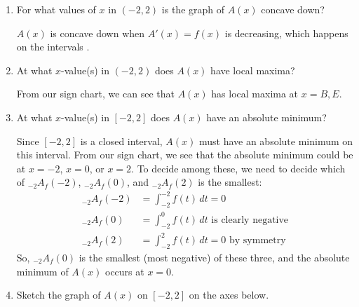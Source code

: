 \documentclass{article}
\begin{document}
\begin{enumerate}
\begin{enumerate}[resume]
  \item
    \begin{problem}[\vfill\newpage]
      For what values of $x$ in $(-2, 2)$ is the graph of $A(x)$
      concave down?
    \end{problem}

    \begin{solution}
      $A(x)$ is concave down when $A'(x) = f(x)$ is
      decreasing, which happens on the intervals .
    \end{solution}

  \item
    \begin{problem}[\vfill]
      At what $x$-value(s) in $(-2, 2)$ does $A(x)$ have local
      maxima? 
    \end{problem}

    \begin{solution}
      From our sign chart, we can see that $A(x)$ has local
      maxima at $\boxed{x = B, E}$.
    \end{solution}

  \item 
    \begin{problem}[\vfill]
      At what $x$-value(s) in $[-2, 2]$ does $A(x)$ have an
      absolute minimum?
    \end{problem}

    \begin{solution}
      Since $[-2, 2]$ is a closed interval, $A(x)$ must have an
      absolute minimum on this interval.  From our sign chart, we see that
      the absolute minimum could be at $x= -2$, $x = 0$, or $x = 2$.  To
      decide among these, we need to decide which of $_{-2} A_f(-2)$,
      $_{-2} A_f(0)$, and $_{-2} A_f(2)$ is the smallest:
      \begin{align*}
        _{-2} A_f(-2) &= \int_{-2}^{-2} f(t)\,dt = 0 \\
        _{-2} A_f(0) &= \int_{-2}^0 f(t)\,dt \text{ is clearly negative} \\ 
        _{-2} A_f(2) &= \int_{-2}^2 f(t)\,dt = 0 \text{ by symmetry}
      \end{align*}
      So, $_{-2} A_f(0)$ is the smallest (most negative) of these three,
      and the absolute minimum of $A(x)$ occurs at $\boxed{x =
        0}$.
    \end{solution}

  \item
    \begin{problem}[\vfill\newpage]
      Sketch the graph of $A(x)$ on $[-2, 2]$ on the axes below.


\end{problem}
\end{enumerate}
\end{enumerate}
\end{document}
